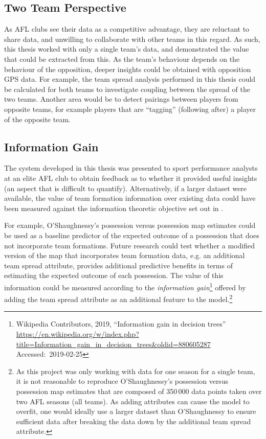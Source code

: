 \subsection{Two Team Perspective}

As AFL clubs see their data as a competitive advantage, they are reluctant to share data, and unwilling to collaborate with other teams in this regard. As such, this thesis worked with only a single team's data, and demonstrated the value that could be extracted from this. As the team's behaviour depends on the behaviour of the opposition, deeper insights could be obtained with opposition GPS data. For example, the team spread analysis performed in this thesis could be calculated for both teams to investigate coupling between the spread of the two teams. Another area would be to detect pairings between players from opposite teams, for example players that are ``tagging'' (following after) a player of the opposite team.

\subsection{Information Gain} \label{sec:conclusioninfogain}

The system developed in this thesis was presented to sport performance analysts at an elite AFL club to obtain feedback as to whether it provided useful insights (an aspect that is difficult to quantify). Alternatively, if a larger dataset were available, the value of team formation information over existing data could have been measured against the information theoretic objective set out in .

For example, O'Shaughnessy's possession versus possession map \cite{oshaughnessy_possession_2006} estimates could be used as a baseline predictor of the expected outcome of a possession that does not incorporate team formations. Future research could test whether a modified version of the map that incorporates team formation data, e.g. an additional team spread attribute, provides additional predictive benefits in terms of estimating the expected outcome of each possession. The value of this information could be measured according to the \textit{information gain}\footnote{Wikipedia Contributors, 2019, ``Information gain in decision trees'' \url{https://en.wikipedia.org/w/index.php?title=Information_gain_in_decision_trees&oldid=880605287} Accessed:~2019-02-25} offered by adding the team spread attribute as an additional feature to the model.\footnote{As this project was only working with data for one season for a single team, it is not reasonable to reproduce O'Shaughnessy's possession versus possession map estimates that are composed of 350\,000 %
data points taken over two AFL seasons (all teams). As adding attributes can cause the model to overfit, one would ideally use a larger dataset than O'Shaughnessy to ensure sufficient data after breaking the data down by the additional team spread attribute.}

